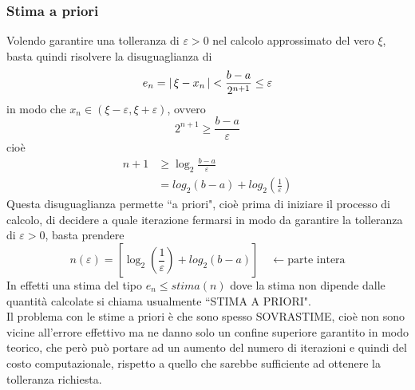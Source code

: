 \documentclass[12pt]{article}
\DeclarePairedDelimiter{\abs}{\lvert}{\rvert}
\begin{document}
\subsubsection{Stima a priori}
Volendo garantire una tolleranza di $\varepsilon > 0 $ nel calcolo approssimato del vero $\xi$, basta quindi risolvere la disuguaglianza di 
\[ e_n = \abs{\,\xi - x_n\,} < \frac{b-a}{2^{n+1}} \le \varepsilon \]
in modo che $x_n \in (\xi -  \varepsilon, \xi + \varepsilon)$, ovvero \[ 2^{n+1} \geq  \frac{b-a}{\varepsilon} \]
cioè
\[\begin{split}
   n + 1 & \ge \log_2{\frac{b-a}{\varepsilon}} \\
    & = log_2\left(b-a\right) + log_2\left(\frac{1}{\varepsilon}\right)
\end{split}\]
Questa disuguaglianza permette ``a priori", cioè prima di iniziare il processo di calcolo, di decidere a quale iterazione fermarsi in modo da garantire la tolleranza di $\varepsilon > 0$, basta prendere 
\[ n(\varepsilon) = [\log_2\left(\frac{1}{\varepsilon}\right) + log_2{(b-a)}] \quad \leftarrow \text{parte intera}\]
In effetti una stima del tipo $e_n \leq stima(n)$ dove la stima non dipende dalle quantità calcolate si chiama usualmente ``STIMA A PRIORI".\\
Il problema con le stime a priori è che sono spesso SOVRASTIME, cioè non sono vicine all'errore effettivo ma ne danno solo un confine superiore garantito in modo teorico, che però può portare ad un aumento del numero di iterazioni e quindi del costo computazionale, rispetto a quello che sarebbe sufficiente ad ottenere la tolleranza richiesta.
\end{document}
